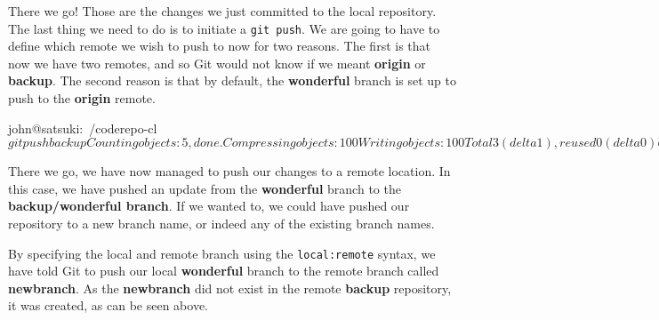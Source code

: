 There we go! Those are the changes we just committed to the local repository.
The last thing we need to do is to initiate a \texttt{git push}.
We are going to have to define which remote we wish to push to now for two reasons.
The first is that now we have two remotes, and so Git would not know if we meant \textbf{origin} or \textbf{backup}.
The second reason is that by default, the \textbf{wonderful} branch is set up to push to the \textbf{origin} remote.

\begin{code}
john@satsuki:~/coderepo-cl$ git push backup
Counting objects: 5, done.
Compressing objects: 100%
Writing objects: 100%
Total 3 (delta 1), reused 0 (delta 0)
Unpacking objects: 100%
To /home/john/coderepo-bk
   1c3206a..dbf1e9a  wonderful -> wonderful
john@satsuki:~/coderepo-cl$
\end{code}

There we go, we have now managed to push our changes to a remote location.
In this case, we have pushed an update from the \textbf{wonderful} branch to the \textbf{backup/wonderful branch}.
If we wanted to, we could have pushed our repository to a new branch name, or indeed any of the existing branch names.


By specifying the local and remote branch using the \texttt{local:remote} syntax, we have told Git to push our local \textbf{wonderful} branch to the remote branch called \textbf{newbranch}.
As the \textbf{newbranch} did not exist in the remote \textbf{backup} repository, it was created, as can be seen above.

